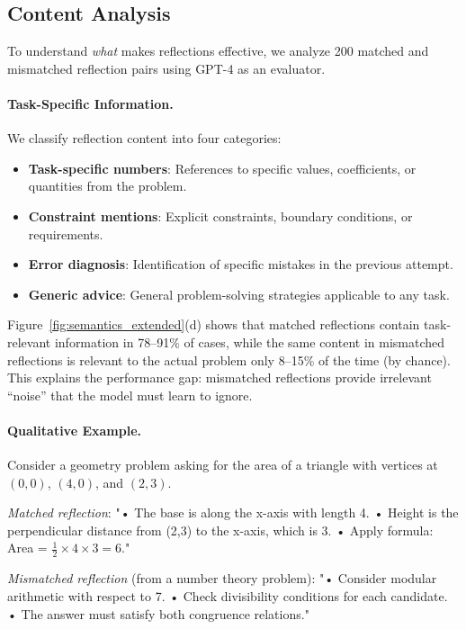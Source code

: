 \documentclass{article}
\theoremstyle{plain}
\theoremstyle{definition}
\theoremstyle{remark}
\begin{document}
\subsection{Content Analysis}

To understand \emph{what} makes reflections effective, we analyze 200 matched and mismatched reflection pairs using GPT-4 as an evaluator.

\paragraph{Task-Specific Information.}
We classify reflection content into four categories:
\begin{itemize}
    \item \textbf{Task-specific numbers}: References to specific values, coefficients, or quantities from the problem.
    \item \textbf{Constraint mentions}: Explicit constraints, boundary conditions, or requirements.
    \item \textbf{Error diagnosis}: Identification of specific mistakes in the previous attempt.
    \item \textbf{Generic advice}: General problem-solving strategies applicable to any task.
\end{itemize}

Figure~\ref{fig:semantics_extended}(d) shows that matched reflections contain task-relevant information in 78--91\% of cases, while the same content in mismatched reflections is relevant to the actual problem only 8--15\% of the time (by chance). This explains the performance gap: mismatched reflections provide irrelevant ``noise'' that the model must learn to ignore.

\paragraph{Qualitative Example.}
Consider a geometry problem asking for the area of a triangle with vertices at $(0,0)$, $(4,0)$, and $(2,3)$.

\textit{Matched reflection}: "• The base is along the x-axis with length 4. • Height is the perpendicular distance from (2,3) to the x-axis, which is 3. • Apply formula: Area = $\frac{1}{2} \times 4 \times 3 = 6$."

\textit{Mismatched reflection} (from a number theory problem): "• Consider modular arithmetic with respect to 7. • Check divisibility conditions for each candidate. • The answer must satisfy both congruence relations."
\end{document}
